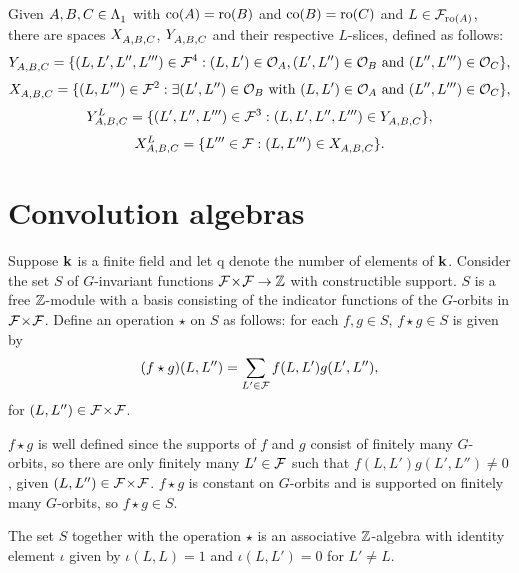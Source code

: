 \documentclass[a4paper, 11pt]{report}
\begin{document}
Given $A,B,C\in\matrices$ with $\co{A}=\ro{B}$ and $\co{B}=\ro{C}$ and $L\in\flags_{\ro{A}}$, there are spaces $\xprod{A,B,C}$, $\yprod{A,B,C}$ and their respective $L$-slices, defined as follows:
\begin{equation*}
\yprod{A,B,C} = \{(L,L',L'',L''')\in\flags^4: (L,L')\in\orbit{A}, (L',L'')\in\orbit{B} \text{ and } (L'',L''')\in\orbit{C}\},
\end{equation*}
\begin{equation*}
\xprod{A,B,C} = \{(L,L''')\in\flags^2: \exists (L',L'')\in\orbit{B} \text{ with } (L,L')\in\orbit{A} \text{ and } (L'',L''')\in\orbit{C}\},
\end{equation*}
\begin{equation*}
\yprod[L]{A,B,C} = \{ (L',L'',L''')\in\flags^3: (L,L',L'',L''')\in\yprod{A,B,C}\},
\end{equation*}
\begin{equation*}
\xprod[L]{A,B,C} = \{ L'''\in\flags: (L,L''')\in\xprod{A,B,C}\}.
\end{equation*}

\section{Convolution algebras}

Suppose $\field$ is a finite field and let $\mathrm{q}$ denote the number of elements of $\field$. Consider the set $S$ of $G$-invariant functions $\dblflags\to\integers$ with constructible support. $S$ is a free $\integers$-module with a basis consisting of the indicator functions of the $G$-orbits in $\dblflags$. Define an operation $\star$ on $S$ as follows: for each $f,g\in S$, $f\star g\in S$ is given by
\begin{equation*}
(f\star g)(L,L'') = \sum_{L'\in\flags} f(L,L')g(L',L''),
\end{equation*}
for $(L,L'')\in\dblflags$. 

$f\star g$ is well defined since the supports of $f$ and $g$ consist of finitely many $G$-orbits, so there are only finitely many $L'\in\flags$ such that $f(L,L')g(L',L'')\neq 0$, given $(L,L'')\in\dblflags$. $f\star g$ is constant on $G$-orbits and is supported on finitely many $G$-orbits, so $f\star g\in S$.

\begin{lemma}\label{lemma:convolution-algebra}
The set $S$ together with the operation $\star$ is an associative $\integers$-algebra with identity element $\iota$ given by $\iota(L,L) = 1$ and $\iota(L,L')=0$ for $L'\neq L$.
\end{lemma}
\end{document}
